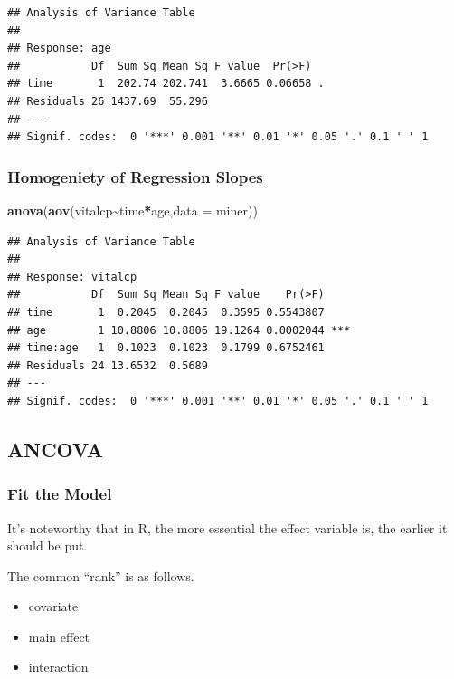 \documentclass[
]{ctexart}
\newenvironment{Shaded}{\begin{snugshade}}{\end{snugshade}}
\newcommand{\AttributeTok}[1]{\textcolor[rgb]{0.13,0.29,0.53}{#1}}
\newcommand{\FunctionTok}[1]{\textcolor[rgb]{0.13,0.29,0.53}{\textbf{#1}}}
\newcommand{\NormalTok}[1]{#1}
\newcommand{\SpecialCharTok}[1]{\textcolor[rgb]{0.81,0.36,0.00}{\textbf{#1}}}
\providecommand{\tightlist}{%
  \setlength{\itemsep}{0pt}\setlength{\parskip}{0pt}}
\begin{document}
\begin{verbatim}
## Analysis of Variance Table
## 
## Response: age
##           Df  Sum Sq Mean Sq F value  Pr(>F)  
## time       1  202.74 202.741  3.6665 0.06658 .
## Residuals 26 1437.69  55.296                  
## ---
## Signif. codes:  0 '***' 0.001 '**' 0.01 '*' 0.05 '.' 0.1 ' ' 1
\end{verbatim}

\hypertarget{homogeniety-of-regression-slopes}{%
\subsubsection{Homogeniety of Regression
Slopes}\label{homogeniety-of-regression-slopes}}

\begin{Shaded}
\begin{Highlighting}[]
\FunctionTok{anova}\NormalTok{(}\FunctionTok{aov}\NormalTok{(vitalcp}\SpecialCharTok{\textasciitilde{}}\NormalTok{time}\SpecialCharTok{*}\NormalTok{age,}\AttributeTok{data =}\NormalTok{ miner))}
\end{Highlighting}
\end{Shaded}

\begin{verbatim}
## Analysis of Variance Table
## 
## Response: vitalcp
##           Df  Sum Sq Mean Sq F value    Pr(>F)    
## time       1  0.2045  0.2045  0.3595 0.5543807    
## age        1 10.8806 10.8806 19.1264 0.0002044 ***
## time:age   1  0.1023  0.1023  0.1799 0.6752461    
## Residuals 24 13.6532  0.5689                      
## ---
## Signif. codes:  0 '***' 0.001 '**' 0.01 '*' 0.05 '.' 0.1 ' ' 1
\end{verbatim}

\hypertarget{ancova-1}{%
\subsection{ANCOVA}\label{ancova-1}}

\hypertarget{fit-the-model}{%
\subsubsection{Fit the Model}\label{fit-the-model}}

It's noteworthy that in R, the more essential the effect variable is,
the earlier it should be put.

The common ``rank'' is as follows.

\begin{itemize}
\tightlist
\item
  covariate
\item
  main effect
\item
  interaction
\end{itemize}
\end{document}
